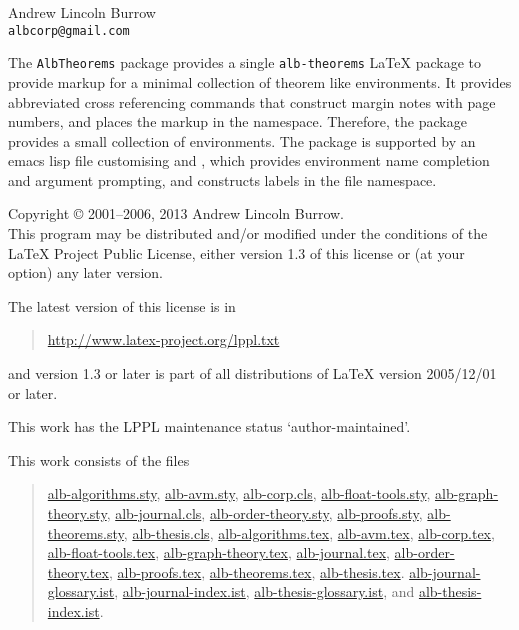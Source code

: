 \documentclass[11pt,a4paper,oneside,titlepage]{alb-corp}
\begin{document}


\begin{albTitlePage}


  Andrew Lincoln Burrow\\
  \texttt{albcorp@gmail.com}



  The \texttt{AlbTheorems} package provides a single
  \texttt{alb-theorems} \LaTeX{} package to provide markup for a minimal
  collection of theorem like environments.  It provides abbreviated
  cross referencing commands that construct margin notes with page
  numbers, and places the markup in the \albLogo{} namespace.
  Therefore, the package provides a small collection of environments.
  The package is supported by an emacs lisp file customising \AUCTeX{}
  and \RefTeX{}, which provides environment name completion and argument
  prompting, and constructs labels in the file namespace.



  Copyright \copyright{} 2001--2006, 2013 Andrew Lincoln Burrow.\\
  This program may be distributed and/or modified under the conditions
  of the \LaTeX{} Project Public License, either version 1.3 of this
  license or (at your option) any later version.

  \medskip{}

  The latest version of this license is in
  \begin{quote}
    \url{http://www.latex-project.org/lppl.txt}
  \end{quote}
  and version 1.3 or later is part of all distributions of LaTeX version
  2005/12/01 or later.

  \medskip{}

  This work has the LPPL maintenance status `author-maintained'.

  \medskip{}

  This work consists of the files
  \begin{quote}
    \begin{flushleft}
      \url{alb-algorithms.sty}, \url{alb-avm.sty}, \url{alb-corp.cls},
      \url{alb-float-tools.sty}, \url{alb-graph-theory.sty},
      \url{alb-journal.cls}, \url{alb-order-theory.sty},
      \url{alb-proofs.sty}, \url{alb-theorems.sty},
      \url{alb-thesis.cls}, \url{alb-algorithms.tex}, \url{alb-avm.tex},
      \url{alb-corp.tex}, \url{alb-float-tools.tex},
      \url{alb-graph-theory.tex}, \url{alb-journal.tex},
      \url{alb-order-theory.tex}, \url{alb-proofs.tex},
      \url{alb-theorems.tex}, \url{alb-thesis.tex}.
      \url{alb-journal-glossary.ist}, \url{alb-journal-index.ist},
      \url{alb-thesis-glossary.ist}, and \url{alb-thesis-index.ist}.
    \end{flushleft}
  \end{quote}



\end{albTitlePage}
\end{document}
